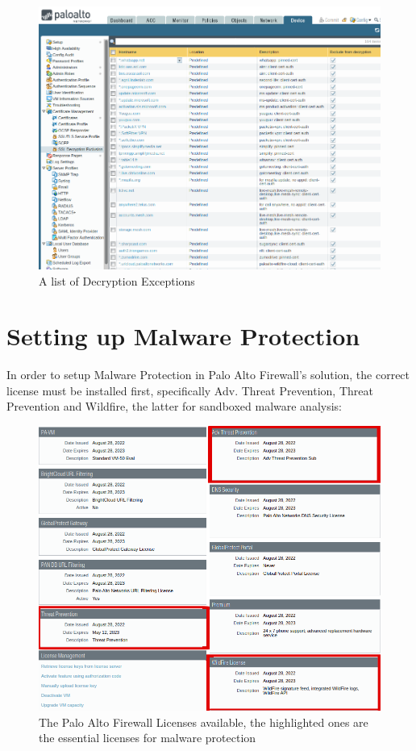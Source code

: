 \begin{figure}[!h]
\centering
 \includegraphics[width=12cm]{img/decryption_exceptions.png}
	\caption{A list of Decryption Exceptions}\label{Decryption Exceptions}
\end{figure}


\newpage

\section{Setting up Malware Protection}

In order to setup Malware Protection in Palo Alto Firewall's solution, the correct license must be installed first, specifically Adv. Threat Prevention, Threat Prevention and Wildfire, the latter for sandboxed malware analysis:

\begin{figure}[h!]
 \centering
 \includegraphics[width=13.5cm]{img/PAN_Licenses.png}
 \caption{The Palo Alto Firewall Licenses available, the highlighted ones are the essential licenses for malware protection}
 \label{fig: PanOS Licenses}
\end{figure}

